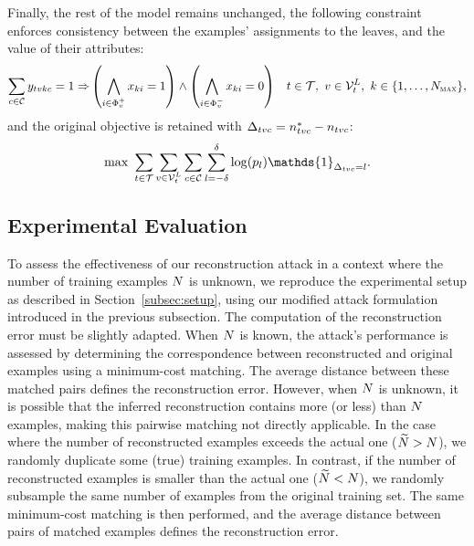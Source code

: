 Finally, the rest of the model remains unchanged, the following constraint enforces consistency between the examples' assignments to the leaves, and the value of their attributes:
\begin{align}
\sum\limits_{\class \in \classes} \varyb[\tree,\node,\example,\class] = 1 \Rightarrow &\left(\displaystyle\bigwedge_{i\in\Phi_v^+} \varx[k,i] = 1 \right) \wedge
\left( \displaystyle\bigwedge_{i\in \Phi_v^-} \varx[k,i] = 0 \right) & \tree \in \forest,~\node \in \leaves[\tree],~\example \in \{1,\dots,\nexamples_{\textsc{max}}\},\label{constr_flow_attr_values_bis}
\end{align}
and the original objective is retained with $\Delta_{\tree\node\class} = \nodesupport[\tree,\node,\class]^{*} - \nodesupport[\tree,\node,\class]$:
\begin{align}
    \max \ \sum\limits_{\tree \in \forest}\sum\limits_{\node \in \leaves[\tree]} \sum\limits_{\class \in \classes} \sum\limits_{\noiseval = -\delta}^{\delta} \log(p_\noiseval) \mathds{1}_{\Delta_{\tree\node\class} = \noiseval}.
\end{align}

\subsection{Experimental Evaluation} 

To assess the effectiveness of our reconstruction attack in a context where the number of training examples $N$ is unknown, we reproduce the experimental setup as described in Section~\ref{subsec:setup}, using our modified attack formulation introduced in the previous subsection. The computation of the reconstruction error must be slightly adapted. When $N$ is known, the attack's performance is assessed by determining the correspondence between reconstructed and original examples using a minimum-cost matching. The average distance between these matched pairs defines the reconstruction error.
However, when $N$ is unknown, it is possible that the inferred reconstruction contains more (or less) than $N$ examples, making this pairwise matching not directly applicable. In the case where the number of reconstructed examples exceeds the actual one ($\widetilde{N} > N$), we randomly duplicate some (true) training examples. In contrast, if the number of reconstructed examples is smaller than the actual one ($\widetilde{N} < N$), we randomly subsample the same number of examples from the original training set. The same minimum-cost matching is then performed, and the average distance between pairs of matched examples defines the reconstruction error. 

